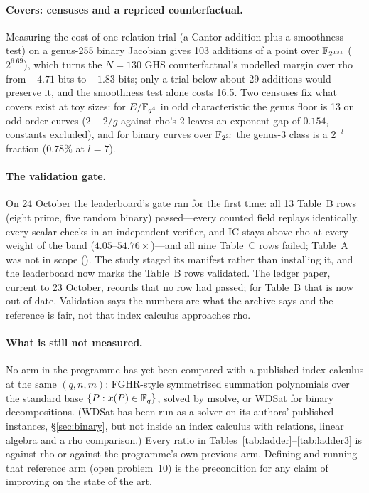 \paragraph{Covers: censuses and a repriced counterfactual.} Measuring the
cost of one relation trial (a Cantor addition plus a smoothness test) on a
genus-255 binary Jacobian gives 103 additions of a point over $\mathbb{F}_{2^{131}}$
($2^{6.69}$), which turns the $N=130$ GHS counterfactual's modelled margin
over rho from $+4.71$ bits to $-1.83$ bits; only a trial below about 29
additions would preserve it, and the smoothness test alone costs 16.5. Two
censuses fix what covers exist at toy sizes: for $E/\mathbb{F}_{q^4}$ in odd
characteristic the genus floor is 13 on odd-order curves ($2-2/g$ against
rho's 2 leaves an exponent gap of $0.154$, constants excluded), and for
binary curves over $\mathbb{F}_{2^{3l}}$ the genus-3 class is a $2^{-l}$ fraction
($0.78\%$ at $l=7$).

\paragraph{The validation gate.} On 24 October the leaderboard's gate ran
for the first time: all 13 Table~B rows (eight prime, five random binary)
passed---every counted field replays identically, every scalar checks in an
independent verifier, and IC stays above rho at every weight of the band
($4.05$--$54.76\times$)---and all nine Table~C rows failed; Table~A was not
in scope (). The study staged its
manifest rather than installing it, and the leaderboard now marks the
Table~B rows validated. The ledger paper, current to 23 October, records
that no row had passed; for Table~B that is now out of date. Validation
says the numbers are what the archive says and the reference is fair, not
that index calculus approaches rho.

\paragraph{What is still not measured.} No arm in the programme has yet
been compared with a published index calculus at the same $(q,n,m)$:
FGHR-style symmetrised summation polynomials over the standard base
$\{P: x(P)\in\mathbb{F}_q\}$, solved by msolve, or WDSat for binary
decompositions. (WDSat has been run as a solver on its authors' published
instances, \S\ref{sec:binary}, but not inside an index calculus with
relations, linear algebra and a rho comparison.) Every ratio in Tables~\ref{tab:ladder}--\ref{tab:ladder3} is
against rho or against the programme's own previous arm. Defining and running
that reference arm (open problem~10) is the precondition for any claim of
improving on the state of the art.

